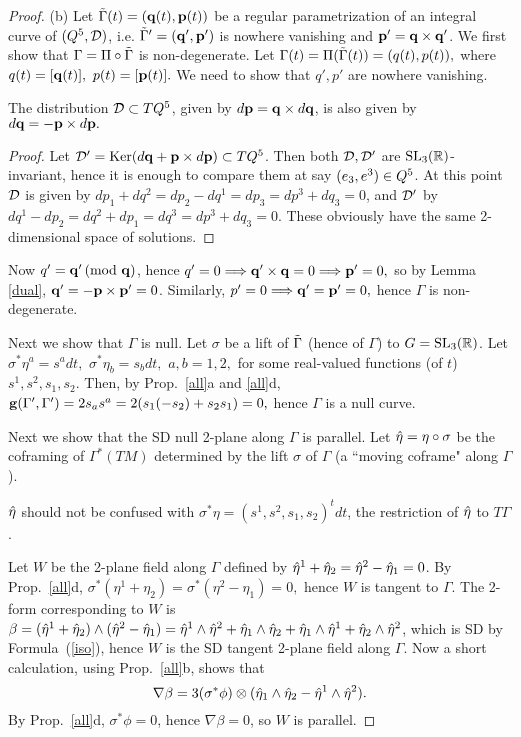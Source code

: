 \begin{proof}
\mn(b)  Let $\tilde \Gamma(t)=(\mathbf q(t),{\mathbf p}(t))$  be  a regular parametrization of an integral curve of $(Q^5, {\mathcal D})$, i.e.  $\tilde \Gamma'=(\mathbf q', {\mathbf p}')$  is nowhere vanishing and  ${\mathbf p}'=\mathbf q\times \mathbf q'$. We  first show that $\Gamma=\Pi\circ\tilde \Gamma$ 
  is non-degenerate. Let $\Gamma(t)=\Pi(\tilde \Gamma(t))=(q(t), p(t)),$ 
  where $q(t)=[\mathbf q(t)],$ 
  $p(t)=[{\mathbf p}(t)].$ We need to show that 
 $q',  p'$ are nowhere vanishing.


\begin{lemma}\label{dual} The distribution ${\mathcal D}\subset TQ^5$, given by $d{\mathbf p}=\mathbf q\times d\mathbf q$, is also given by $d\mathbf q=-{\mathbf p}\times d{\mathbf p}.$ 
\end{lemma}
\begin{proof} Let  ${\mathcal D}'={\rm Ker}(d\mathbf q+{\mathbf p}\times d{\mathbf p})\subset TQ^5$. Then both ${\mathcal D},{\mathcal D}'$ are ${\mathrm{SL}_3(\mathbb{R})}$-invariant, hence it is enough to compare them at say $(e_3, e^3)\in Q^5$. At this point ${\mathcal D}$ is given by $dp_1+dq^2=dp_2-dq^1=dp_3=dp^3+dq_3=0$, and ${\mathcal D}'$ by $dq^1-dp_2=dq^2+dp_1=dq^3=dp^3+dq_3=0.$ These obviously have the same 2-dimensional space of  solutions. 
\end{proof}

Now   $q'=\mathbf q'\,(\hbox{mod } \mathbf q)$, hence  $q'=0\Longrightarrow  \mathbf q'\times\mathbf q=0\Longrightarrow {\mathbf p}'=0,$ so by Lemma \ref{dual}, $\mathbf q'=-{\mathbf p}\times{\mathbf p}'=0$. Similarly, $p'=0\Longrightarrow \mathbf q'={\mathbf p}'=0,$ hence $\Gamma$ is non-degenerate. 


 Next we show that $\Gamma$ is null. Let $\sigma$ be a lift of $\tilde \Gamma$ (hence of  $\Gamma$) to $G={\mathrm{SL}_3(\mathbb{R})}$. Let 
$\sigma^*\eta^a=s^adt, $ $\sigma^*\eta_b=s_bdt,$ $a,b=1,2, $ for some  real-valued functions (of $t$) $s^1, s^2, s_1, s_2$.  Then, by Prop.~\ref{all}a and \ref{all}d, $\mathbf{ g}(\Gamma', \Gamma')=2s_as^a=
2(s_1 (-s_2)+s_2s_1)=0,$ hence $\Gamma$ is a null curve. 

 Next we show that  the SD null 2-plane along $\Gamma$  is parallel.
Let  $\hat\eta=\eta\circ\sigma$ be the  coframing of $\Gamma^*(TM)$ determined by the lift $\sigma$ of $\Gamma$ (a ``moving coframe"  along 
$\Gamma$).

\begin{rmrk} $\hat\eta$  should not be  confused with
 $\sigma^*\eta=(s^1, s^2, s_1, s_2)^tdt$, the restriction of $\hat\eta$ to $T\Gamma$.   
 \end{rmrk}
 
 Let  $W$ be  the 2-plane field along 
 $\Gamma$ defined by  $\hat\eta^1+\hat\eta_2=\hat\eta^2-\hat\eta_1=0$.  By Prop.~\ref{all}d, 
 $\sigma^*(\eta^1+\eta_2)=\sigma^*(\eta^2-\eta_1)=0,$ hence $W$ is tangent to
 $\Gamma$. The  2-form corresponding to $W$ is 
 $\beta=(\hat\eta^1+\hat\eta_2)\wedge(\hat\eta^2-\hat\eta_1)=
 \hat\eta^1\wedge\hat\eta^2+\hat\eta_1\wedge\hat\eta_2+\hat\eta_1\wedge\hat\eta^1+\hat\eta_2\wedge\hat\eta^2$, 
 which is SD by  Formula~(\ref{iso}),  hence $W$ is the  SD tangent 2-plane field along $\Gamma$.
  Now a short calculation, using Prop.~\ref{all}b, shows that
  $$\nabla \beta =3(\sigma^*\phi)\otimes (\hat\eta_1\wedge\hat\eta_2-\hat\eta^1\wedge\hat\eta^2).$$ By Prop.~\ref{all}d, $\sigma^*\phi=0$, hence $\nabla \beta=0$, so $W$ is parallel. 


\end{proof}
